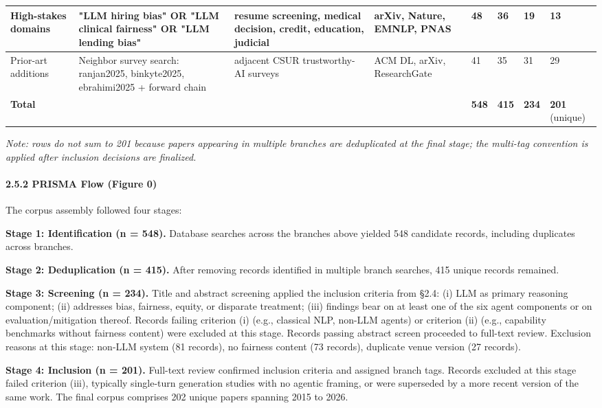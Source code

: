 \documentclass[10pt]{article}
\begin{document}
\begin{center}
\begin{longtable}{|p{}|p{}|p{}|p{}|p{}|p{}|p{}|p{}|}
High-stakes domains & "LLM hiring bias" OR "LLM clinical fairness" OR "LLM lending bias" & resume screening, medical decision, credit, education, judicial & arXiv, Nature, EMNLP, PNAS & 48 & 36 & 19 & 13 \\ \hline
Prior-art additions & Neighbor survey search: ranjan2025, binkyte2025, ebrahimi2025 + forward chain & adjacent CSUR trustworthy-AI surveys & ACM DL, arXiv, ResearchGate & 41 & 35 & 31 & 29 \\ \hline
\textbf{Total} &  &  &  & \textbf{548} & \textbf{415} & \textbf{234} & \textbf{201} (unique) \\ \hline
\end{longtable}\end{center}

\emph{Note: rows do not sum to 201 because papers appearing in multiple branches are deduplicated at the final stage; the multi-tag convention is applied after inclusion decisions are finalized.}

\paragraph*{2.5.2 PRISMA Flow (Figure 0)}

The corpus assembly followed four stages:

\textbf{Stage 1: Identification (n = 548).} Database searches across the branches above yielded 548 candidate records, including duplicates across branches.

\textbf{Stage 2: Deduplication (n = 415).} After removing records identified in multiple branch searches, 415 unique records remained.

\textbf{Stage 3: Screening (n = 234).} Title and abstract screening applied the inclusion criteria from \S{}2.4: (i) LLM as primary reasoning component; (ii) addresses bias, fairness, equity, or disparate treatment; (iii) findings bear on at least one of the six agent components or on evaluation/mitigation thereof. Records failing criterion (i) (e.g., classical NLP, non-LLM agents) or criterion (ii) (e.g., capability benchmarks without fairness content) were excluded at this stage. Records passing abstract screen proceeded to full-text review. Exclusion reasons at this stage: non-LLM system (81 records), no fairness content (73 records), duplicate venue version (27 records).

\textbf{Stage 4: Inclusion (n = 201).} Full-text review confirmed inclusion criteria and assigned branch tags. Records excluded at this stage failed criterion (iii), typically single-turn generation studies with no agentic framing, or were superseded by a more recent version of the same work. The final corpus comprises 202 unique papers spanning 2015 to 2026.
\end{document}
